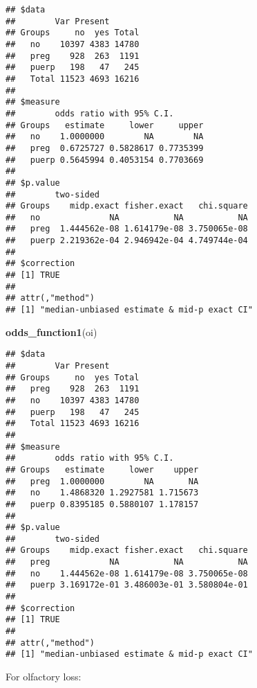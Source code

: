 \documentclass[
]{article}
\newenvironment{Shaded}{\begin{snugshade}}{\end{snugshade}}
\newcommand{\DataTypeTok}[1]{\textcolor[rgb]{0.13,0.29,0.53}{#1}}
\newcommand{\KeywordTok}[1]{\textcolor[rgb]{0.13,0.29,0.53}{\textbf{#1}}}
\newcommand{\NormalTok}[1]{#1}
\newcommand{\OperatorTok}[1]{\textcolor[rgb]{0.81,0.36,0.00}{\textbf{#1}}}
\newcommand{\OtherTok}[1]{\textcolor[rgb]{0.56,0.35,0.01}{#1}}
\newcommand{\StringTok}[1]{\textcolor[rgb]{0.31,0.60,0.02}{#1}}
\begin{document}
\begin{verbatim}
## $data
##        Var Present
## Groups     no  yes Total
##   no    10397 4383 14780
##   preg    928  263  1191
##   puerp   198   47   245
##   Total 11523 4693 16216
## 
## $measure
##        odds ratio with 95% C.I.
## Groups   estimate     lower     upper
##   no    1.0000000        NA        NA
##   preg  0.6725727 0.5828617 0.7735399
##   puerp 0.5645994 0.4053154 0.7703669
## 
## $p.value
##        two-sided
## Groups    midp.exact fisher.exact   chi.square
##   no              NA           NA           NA
##   preg  1.444562e-08 1.614179e-08 3.750065e-08
##   puerp 2.219362e-04 2.946942e-04 4.749744e-04
## 
## $correction
## [1] TRUE
## 
## attr(,"method")
## [1] "median-unbiased estimate & mid-p exact CI"
\end{verbatim}

\begin{Shaded}
\begin{Highlighting}[]
\KeywordTok{odds_function1}\NormalTok{(oi)}
\end{Highlighting}
\end{Shaded}

\begin{verbatim}
## $data
##        Var Present
## Groups     no  yes Total
##   preg    928  263  1191
##   no    10397 4383 14780
##   puerp   198   47   245
##   Total 11523 4693 16216
## 
## $measure
##        odds ratio with 95% C.I.
## Groups   estimate     lower    upper
##   preg  1.0000000        NA       NA
##   no    1.4868320 1.2927581 1.715673
##   puerp 0.8395185 0.5880107 1.178157
## 
## $p.value
##        two-sided
## Groups    midp.exact fisher.exact   chi.square
##   preg            NA           NA           NA
##   no    1.444562e-08 1.614179e-08 3.750065e-08
##   puerp 3.169172e-01 3.486003e-01 3.580804e-01
## 
## $correction
## [1] TRUE
## 
## attr(,"method")
## [1] "median-unbiased estimate & mid-p exact CI"
\end{verbatim}

For olfactory loss:

\begin{Shaded}
\end{Shaded}
\end{document}

